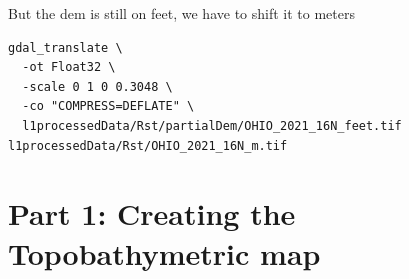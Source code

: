 \documentclass[11pt, a4paper]{article}
\begin{document}
But the dem is still on feet, we have to shift it to meters

\begin{lstlisting}[style=bashdark, title={Linux Terminal Session}]
gdal_translate \
  -ot Float32 \
  -scale 0 1 0 0.3048 \
  -co "COMPRESS=DEFLATE" \
  l1processedData/Rst/partialDem/OHIO_2021_16N_feet.tif l1processedData/Rst/OHIO_2021_16N_m.tif
\end{lstlisting}

\section{Part 1: Creating the Topobathymetric map}
\end{document}
